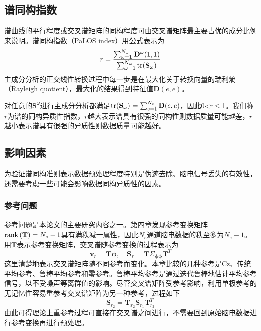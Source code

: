 \subsection{谱同构指数}
谱曲线的平行程度或交叉谱矩阵的同构程度可由交叉谱矩阵最主要占优的成分比例来说明。谱同构指数（PaLOS index）用公式表示为
\begin{equation}\label{eq5.5}
r=\frac{\sum_{\omega=1}^{N_\omega}\mathbf{D}^\omega(1,1)}{\sum_{\omega=1}^{N_\omega}\operatorname{tr}(\mathbf{S}_\omega)}
\end{equation}
主成分分析的正交线性转换过程中每一步是在最大化关于转换向量的瑞利熵（Rayleigh quotient），最大化的结果得到特征值$\mathbf{D}(e,e)$。

对任意的$\mathbf{S}^\omega$进行主成分分析都满足$\operatorname{tr}(\mathbf{S}_\omega)=\sum_{e=1}^{N_e}\mathbf{D}(e,e)$，因此0<r$\leq$1。我们称
$r$为谱的同构异质性指数，$r$越大表示谱具有很强的同构性则数据质量可能越差，$r$越小表示谱具有很强的异质性则数据质量可能越好。

\subsection{影响因素}
为验证谱同构准则表示数据预处理程度特别是伪迹去除、脑电信号丢失的有效性，还需要考虑一些可能会影响数据同构异质性的因素。
\subsubsection{参考问题}
参考问题是本论文的主要研究内容之一。第四章发现参考变换矩阵$\operatorname{rank}{(\mathbf{T})}=N_e-1$具有满秩减一属性，因此$N_e$通道脑电数据的秩至多为$N_e-1$。用$\mathbf{T}$表示参考变换矩阵，交叉谱随参考变换的过程表示为
\begin{equation}\label{eq5.6}
\mathbf{v}_r=\mathbf{T\phi},\quad\mathbf{S}_r=\mathbf{T}\Sigma_\mathbf{\phi\phi}\mathbf{T}^T
\end{equation}
这里清楚地表示交叉谱矩阵随不同参考而变化。本章比较的几种参考是Cz、传统平均参考、鲁棒平均参考和零参考。鲁棒平均参考是通过迭代鲁棒地估计平均参考信号，以不受噪声等离群值的影响。尽管交叉谱矩阵受参考影响，利用单极参考的无记忆性容易重参考交叉谱矩阵为另一种参考，过程如下
\begin{equation}\label{eq5.7}
\mathbf{S}_{r_2}=\mathbf{T}_{r_2}\mathbf{S}_{r_1}\mathbf{T}_{r_2}^T
\end{equation}
由此可得理论上重参考过程可直接在交叉谱之间进行，不需要回到原始脑电数据进行参考变换再进行预处理。


